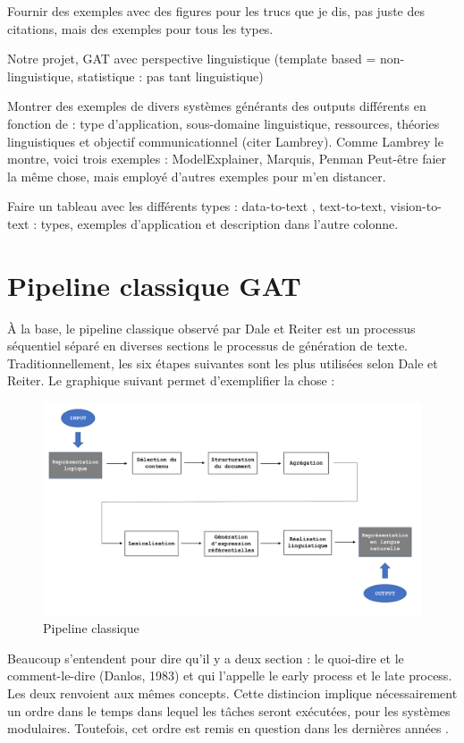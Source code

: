 Fournir des exemples avec des figures pour les trucs que je dis, pas juste des citations, mais des exemples pour tous les types.

Notre projet, GAT avec perspective linguistique (template based = non-linguistique, statistique : pas tant linguistique)

Montrer des exemples de divers systèmes générants des outputs différents en fonction de : type d'application, sous-domaine linguistique, ressources, théories linguistiques et objectif communicationnel (citer Lambrey). Comme Lambrey le montre, voici trois exemples : ModelExplainer, Marquis, Penman
Peut-être faier la même chose, mais employé d'autres exemples pour m'en distancer.

Faire un tableau avec les différents types : data-to-text , text-to-text, vision-to-text : types, exemples d'application et description dans l'autre colonne.

\section{Pipeline classique GAT}

À la base, le pipeline classique observé par Dale et Reiter est un processus séquentiel séparé en diverses sections le processus de génération de texte\citep{ReiterBuildingNaturalLanguage2000}. Traditionnellement, les six étapes suivantes sont les plus utilisées selon Dale et Reiter. Le graphique suivant permet d'exemplifier la chose :

\begin{figure}[h]
	\centering
	\includegraphics[width=1\textwidth, trim = {0cm 0cm 0cm 0cm},clip]{ch2/figs/pipeline.pdf}
	\caption{Pipeline classique}
	\label{fig:Pipeline}
\end{figure}

Beaucoup s'entendent pour dire qu'il y a deux section : le quoi-dire et le comment-le-dire (Danlos, 1983) et \citep{GattSurveyStateArt2017} qui l'appelle le early process et le late process. Les deux renvoient aux mêmes concepts. Cette distincion implique nécessairement un ordre dans le temps dans lequel les tâches seront exécutées, pour les systèmes modulaires. Toutefois, cet ordre est remis en question dans les dernières années \citep{GattSurveyStateArt2017}.

